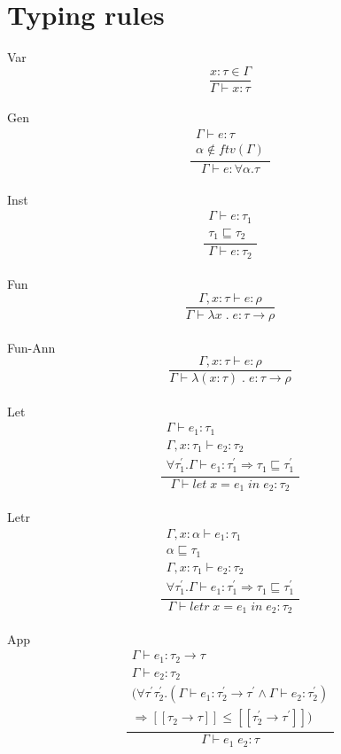 \documentclass[12pt]{article}
\newcommand\eapp[2]{#1 \; #2}
\newcommand\eabs[2]{\lambda #1 \; . \; #2}
\newcommand\eabsanno[3]{\lambda(#1 : #2) \; . \; #3}
\begin{document}
\section{Typing rules}
Var \[\frac{
	x : \tau \in \Gamma
}{
	\Gamma \vdash x : \tau
}\] \\
Gen \[\frac{
	\begin{array}{c}
	\Gamma \vdash e : \tau \\
	\alpha \notin ftv(\Gamma)
	\end{array}
}{
	\Gamma \vdash e : \forall \alpha . \tau
}\]\\
Inst \[\frac{
	\begin{array}{c}
	\Gamma \vdash e : \tau_1 \\
	\tau_1 \sqsubseteq \tau_2
	\end{array}
}{
	\Gamma \vdash e : \tau_2
}\]\\
Fun \[\frac{
	\Gamma , x : \tau \vdash e : \rho
}{
	\Gamma \vdash \eabs{x}{e} : \tau \rightarrow \rho
}\]\\
Fun-Ann \[\frac{
	\Gamma , x : \tau \vdash e : \rho
}{
	\Gamma \vdash \eabsanno{x}{\tau}{e} : \tau \rightarrow \rho
}\]\\
Let \[\frac{
	\begin{array}{c}
	\Gamma \vdash e_1 : \tau_1 \\
	\Gamma , x : \tau_1 \vdash e_2 : \tau_2 \\
	\forall \tau_1^\prime . \Gamma \vdash e_1 : \tau_1^\prime \Rightarrow \tau_1 \sqsubseteq \tau_1^\prime
	\end{array}
}{
	\Gamma \vdash let \; x = e_1 \; in \; e_2 : \tau_2
}\]\\
Letr \[\frac{
	\begin{array}{c}
	\Gamma , x : \alpha \vdash e_1 : \tau_1 \\
	\alpha \sqsubseteq \tau_1 \\
	\Gamma , x : \tau_1 \vdash e_2 : \tau_2 \\
	\forall \tau_1^\prime . \Gamma \vdash e_1 : \tau_1^\prime \Rightarrow \tau_1 \sqsubseteq \tau_1^\prime
	\end{array}
}{
	\Gamma \vdash letr \; x = e_1 \; in \; e_2 : \tau_2
}\]\\
App \[\frac{
	\begin{array}{c}
	\Gamma \vdash e_1 : \tau_2 \rightarrow \tau \\
	\Gamma \vdash e_2 : \tau_2 \\
	(\forall \tau^\prime \tau_2^\prime . (\Gamma \vdash e_1 : \tau_2^\prime \rightarrow \tau^\prime \wedge \Gamma \vdash e_2 : \tau_2^\prime)\\
	\Rightarrow [\![ \tau_2 \rightarrow \tau ]\!] \leq [\![ \tau_2^\prime \rightarrow \tau^\prime ]\!])
	\end{array}
}{
	\Gamma \vdash \eapp{e_1}{e_2} : \tau
}\]\\
\end{document}

